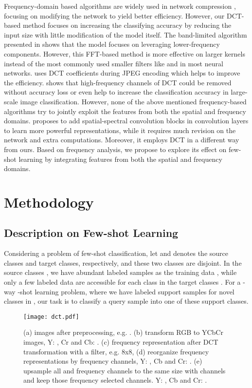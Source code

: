 \documentclass[10pt, conference, compsocconf]{IEEEtran}
\begin{document}
Frequency-domain based algorithms are widely used in network compression \cite{wang2018packing,chen2016compressing}, focusing on modifying the network to yield better efficiency. However, our DCT-based method focuses on increasing the classifying accuracy by reducing the input size with little modification of the model itself. The band-limited algorithm presented in \cite{dziedzic2019band} shows that the model focuses on leveraging lower-frequency components. However, this FFT-based method is more effective on larger kernels instead of the most commonly used smaller filters like  and  in most neural networks. \cite{gueguen2018faster} uses DCT coefficients during JPEG encoding which helps to improve the efficiency.  \cite{XuKai2020} shows that high-frequency channels of DCT could be removed without accuracy loss or even help to increase the classification accuracy in large-scale image classification. However, none of the above mentioned frequency-based algorithms try to jointly exploit the features from both the spatial and frequency domains. \cite{xu2019shifted} proposes to add spatial-spectral convolution blocks in convolution layers to learn more powerful representations, while it requires much revision on the network and extra computations. Moreover, it employs DCT in a different way from ours. Based on frequency analysis, 
we propose to explore its effect on few-shot learning by integrating features from both the spatial and frequency domains. 

\section{Methodology}

\subsection{Description on Few-shot Learning}

Considering a problem of few-shot classification, let  and  denotes the source classes and target classes, respectively, and these two classes are disjoint.  In the source classes , we have abundant labeled samples as the training data , while only a few labeled data  are accessible for each class in the target classes .  For a -way -shot learning problem, where we have  labeled support samples for  novel classes in , our task is to classify a query sample into one of these  support classes.

\begin{figure*}[tp]
\centering
\texttt{[image: dct.pdf]}\caption{{}{(a) images after preprocessing, e.g. . (b) transform RGB to YCbCr images, Y: , Cr and Cb: . (c) frequency representation after DCT transformation with a filter, e.g. 8x8, (d) reorganize frequency representations by frequency channels, Y: , Cb and Cr: . (e) upsample all  and  frequency channels to the same size with  channels and keep those frequency selected channels. Y: , Cb and Cr: .}}
\label{fig2}
\end{figure*}
\end{document}
